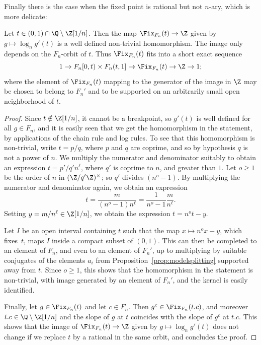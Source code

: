 Finally there is the case when the fixed point is rational but not $n$-ary, which is more delicate:

\begin{lemm}
\label{lem:fix:rational}

Let $t \in (0, 1) \cap \Q \setminus \Z[1/n]$. Then the map $\Fix_{F_n}(t) \to \Z$ given by $g \mapsto \log_n g'(t)$ is a well defined non-trivial homomorphism. The image only depends on the $F_n$-orbit of $t$. Thus $\Fix_{F_n}(t)$ fits into a short exact sequence
\[1 \to F_n[0, t) \times F_n(t, 1] \to \Fix_{F_n}(t) \to \Z \to 1;\]
where the element of $\Fix_{F_n}(t)$ mapping to the generator of the image in $\Z$ may be chosen to belong to $F_n'$ and to be supported on an arbitrarily small open neighborhood of $t$.
\end{lemm}

\begin{proof}
Since $t \notin \Z[1/n]$, it cannot be a breakpoint, so $g'(t)$ is well defined for all $g \in F_n$, and it is easily seen that we get the homomorphism in the statement, by applications of the chain rule and log rules.
To see that this homomorphism is non-trivial, write $t = p/q$, where $p$ and $q$ are coprime, and so by hypothesis $q$ is not a power of $n$. We multiply the numerator and denominator suitably to obtain an expression $t = p'/q' n^\ell$, where $q'$ is coprime to $n$, and greater than $1$. Let $o\ge 1$ be the order of $n$ in $(\Z/q'\Z)^\times$; so $q'$ divides $(n^o - 1)$. By multiplying the numerator and denominator again, we obtain an expression
\[
t = \frac{m}{(n^o - 1) n^\ell} = \frac{1}{n^o-1} \frac{m}{n^\ell}\text{.}
\]
Setting $y = m/n^\ell \in \Z[1/n]$, we obtain the expression $t = n^o t - y$.

Let $I$ be an open interval containing $t$ such that the map $x \mapsto n^o x - y$, which fixes~$t$, maps $I$ inside a compact subset of $(0, 1)$. This can then be completed to an element of $F_n$, and even to an element of $F_n'$, up to multiplying by suitable conjugates of the elements $a_i$ from Proposition~\ref{prop:modelsplitting} supported away from $t$. Since $o \ge 1$, this shows that the homomorphism in the statement is non-trivial, with image generated by an element of $F_n'$, and the kernel is easily identified.

Finally, let $g \in \Fix_{F_n}(t)$ and let $c \in F_n$. Then $g^c \in \Fix_{F_n}(t.c)$, and moreover $t.c \in \Q \setminus \Z[1/n]$ and the slope of $g$ at $t$ coincides with the slope of $g^c$ at $t.c$. This shows that the image of $\Fix_{F_n}(t) \to \Z$ given by $g \mapsto \log_n g'(t)$ does not change if we replace $t$ by a rational in the same orbit, and concludes the proof.
\end{proof}


